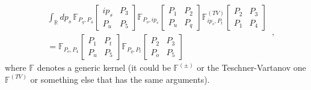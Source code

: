 \documentclass[11pt]{article}
\begin{document}
\begin{equation}\label{eq:Pentagoninlittlepgenericrelation}
    \begin{aligned}
        &\int_{\mathbb{R}} dp_s \, \mathbb{F}_{P_q, P_4} 
    \begin{bmatrix}
     ip_s & P_3 \\
     P_u & P_5
     \end{bmatrix}
\mathbb{F}_{P_o, ip_s} 
    \begin{bmatrix}
     P_1 & P_2 \\
     P_u & P_q
     \end{bmatrix}
\mathbb{F}^{(TV)}_{ip_s, P_t} 
    \begin{bmatrix}
     P_2 & P_3 \\
     P_1 & P_4
     \end{bmatrix}\\
&= \mathbb{F}_{P_o, P_4} 
    \begin{bmatrix}
     P_1 & P_t \\
     P_u & P_5
     \end{bmatrix}
\mathbb{F}_{P_q, P_t} 
    \begin{bmatrix}
     P_2 & P_3 \\
     P_o & P_5
     \end{bmatrix}
    \end{aligned}\,,
\end{equation}
where $\mathbb{F}$ denotes a generic kernel (it could be $\mathbb{F}^{(\pm)}$ or the Teschner-Vartanov one $\mathbb{F}^{(TV)}$ or something else that has the same arguments).
\end{document}
